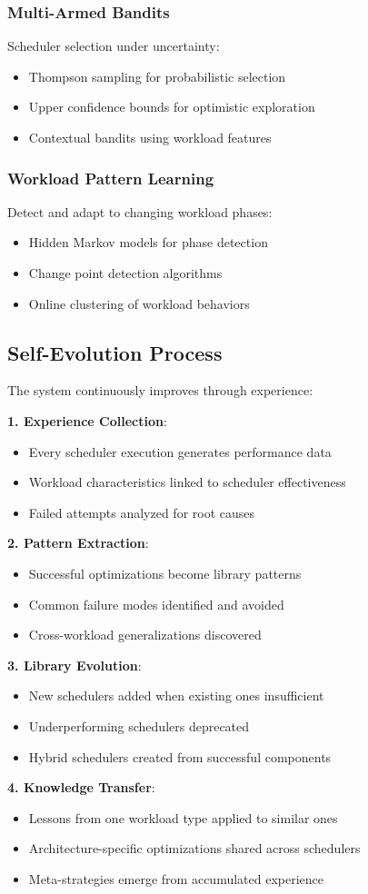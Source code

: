 \subsubsection{Multi-Armed Bandits}
Scheduler selection under uncertainty:
\begin{itemize}
\item Thompson sampling for probabilistic selection
\item Upper confidence bounds for optimistic exploration
\item Contextual bandits using workload features
\end{itemize}

\subsubsection{Workload Pattern Learning}
Detect and adapt to changing workload phases:
\begin{itemize}
\item Hidden Markov models for phase detection
\item Change point detection algorithms
\item Online clustering of workload behaviors
\end{itemize}

\subsection{Self-Evolution Process}

The system continuously improves through experience:

\textbf{1. Experience Collection}:
\begin{itemize}
\item Every scheduler execution generates performance data
\item Workload characteristics linked to scheduler effectiveness
\item Failed attempts analyzed for root causes
\end{itemize}

\textbf{2. Pattern Extraction}:
\begin{itemize}
\item Successful optimizations become library patterns
\item Common failure modes identified and avoided
\item Cross-workload generalizations discovered
\end{itemize}

\textbf{3. Library Evolution}:
\begin{itemize}
\item New schedulers added when existing ones insufficient
\item Underperforming schedulers deprecated
\item Hybrid schedulers created from successful components
\end{itemize}

\textbf{4. Knowledge Transfer}:
\begin{itemize}
\item Lessons from one workload type applied to similar ones
\item Architecture-specific optimizations shared across schedulers
\item Meta-strategies emerge from accumulated experience
\end{itemize}